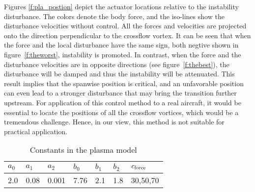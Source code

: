 Figures \ref{f:pla_postion} depict the actuator locations relative to the instability disturbance. The colors denote the body force, and the iso-lines show the  disturbance velocities without control. All the forces and  velocities are projected onto the direction perpendicular to the crossflow vortex. It can be seen that when the force and the local disturbance have the same sign, both negtive shown in figure~\ref{f:theworst}, instability is promoted. In contrast, when the force and the disturbance velocities are in opposite directions (see figure~\ref{f:thebest}), the disturbance will be damped and thus the instability will be attenuated. This result implies that the spanwise position is critical, and an unfavorable position can even lead to a stronger disturbance that may bring the transition further upstream. For application of this control method  to a real aircraft, it would be essential to locate the positions of all the crossflow vortices,  which would be a tremendous challenge. Hence, in our view, this method is not suitable for practical application.
\begin{table}
\caption{Constants in the plasma model}\label{t:constantsPmodel}
    \begin{center}
    \begin{tabular}{p{1.5cm}p{1.5cm}p{1.5cm}p{1.5cm}p{1.5cm}p{1.5cm}p{2cm}}
      \toprule[1.5pt]
      $a_0$ & $a_1$ & $a_2$ & $b_0$ & $b_1$ & $b_2$ & $c_{\rm force}$ \\\midrule[1pt]
      2.0 & 0.08 & 0.001 & 7.76 & 2.1 & 1.8 & 30,50,70 \\
      \bottomrule[1.5pt]
    \end{tabular}
    \end{center}
\end{table}
